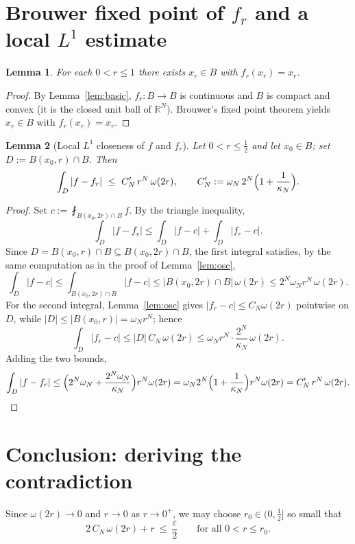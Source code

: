 \documentclass{amsart}
\newtheorem{lemma}{Lemma}
\theoremstyle{definition}
\begin{document}
\section{Brouwer fixed point of $f_r$ and a local $L^1$ estimate}

\begin{lemma}\label{lem:brouwer}
For each $0<r\le1$ there exists $x_r\in B$ with $f_r(x_r)=x_r$.
\end{lemma}

\begin{proof}
By Lemma~\ref{lem:basic}, $f_r:B\to B$ is continuous and $B$ is compact and convex
(it is the closed unit ball of $\mathbb{R}^N$). Brouwer's fixed point theorem
yields $x_r\in B$ with $f_r(x_r)=x_r$.
\end{proof}

\begin{lemma}[Local $L^1$ closeness of $f$ and $f_r$]\label{lem:loc}
Let $0<r\le\tfrac12$ and let $x_0\in B$; set $D:=B(x_0,r)\cap B$. Then
\[
\int_{D}|f-f_r|\ \le\ C'_N\,r^N\,\omega(2r),
\qquad C'_N:=\omega_N\,2^N\Bigl(1+\frac1{\kappa_N}\Bigr).
\]
\end{lemma}

\begin{proof}
Set $c:=\fint_{B(x_0,2r)\cap B}f$. By the triangle inequality,
\[
\int_{D}|f-f_r|\le\int_{D}|f-c|+\int_{D}|f_r-c|.
\]
Since $D=B(x_0,r)\cap B\subseteq B(x_0,2r)\cap B$, the first integral satisfies, by
the same computation as in the proof of Lemma~\ref{lem:osc},
\[
\int_{D}|f-c|\le\int_{B(x_0,2r)\cap B}|f-c|\le |B(x_0,2r)\cap B|\,\omega(2r)
\le 2^N\omega_N r^N\,\omega(2r).
\]
For the second integral, Lemma~\ref{lem:osc} gives $|f_r-c|\le C_N\omega(2r)$
pointwise on $D$, while $|D|\le|B(x_0,r)|=\omega_N r^N$; hence
\[
\int_{D}|f_r-c|\le |D|\,C_N\,\omega(2r)\le \omega_N r^N\cdot\frac{2^N}{\kappa_N}\,\omega(2r).
\]
Adding the two bounds,
\[
\int_{D}|f-f_r|\le\Bigl(2^N\omega_N+\frac{2^N\omega_N}{\kappa_N}\Bigr)r^N\omega(2r)
=\omega_N 2^N\Bigl(1+\frac1{\kappa_N}\Bigr)r^N\omega(2r)=C'_N\,r^N\,\omega(2r). \qedhere
\]
\end{proof}

\section{Conclusion: deriving the contradiction}

Since $\omega(2r)\to0$ and $r\to0$ as $r\to0^+$, we may choose $r_0\in(0,\tfrac12]$
so small that
\begin{equation}\label{eq:choice}
2\,C_N\,\omega(2r)+r\ \le\ \frac{\varepsilon}{2}\qquad\text{for all }0<r\le r_0 .
\end{equation}
\end{document}
